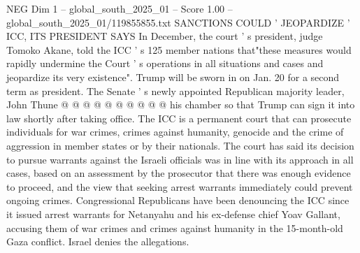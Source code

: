 \begin{textsample}{NEG Dim 1 – global\_south\_2025\_01 – Score 1.00 – global\_south\_2025\_01/119855855.txt}
SANCTIONS COULD ' JEOPARDIZE ' ICC, ITS PRESIDENT SAYS In December, the court ' s president, judge Tomoko Akane, told the ICC ' s 125 member nations that"these measures would rapidly undermine the Court ' s operations in all situations and cases and jeopardize its very existence".
Trump will be sworn in on Jan. 20 for a second term as president.
The Senate ' s newly appointed Republican majority leader, John Thune @ @ @ @ @ @ @ @ @ @ his chamber so that Trump can sign it into law shortly after taking office.
The ICC is a permanent court that can prosecute individuals for war crimes, crimes against humanity, genocide and the crime of aggression in member states or by their nationals.
The court has said its decision to pursue warrants against the Israeli officials was in line with its approach in all cases, based on an assessment by the prosecutor that there was enough evidence to proceed, and the view that seeking arrest warrants immediately could prevent ongoing crimes.
Congressional Republicans have been denouncing the ICC since it issued arrest warrants for Netanyahu and his ex-defense chief Yoav Gallant, accusing them of war crimes and crimes against humanity in the 15-month-old Gaza conflict.
Israel denies the allegations.

\end{textsample}
